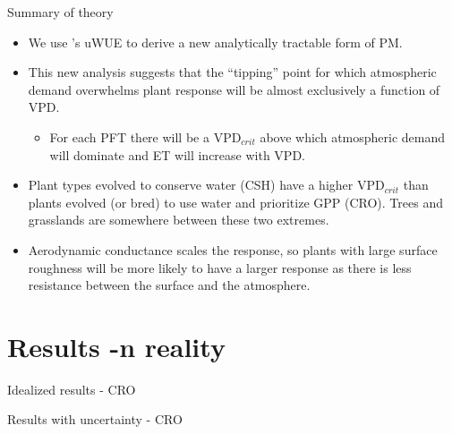 \documentclass{beamer}
\begin{document}
\begin{frame}{Summary of theory}
  \begin{itemize}
  \item We use \cite{Zhou_2016}'s uWUE to derive a new analytically tractable form of PM.
  \item This new analysis suggests that the ``tipping'' point for which atmospheric demand overwhelms plant response will be almost exclusively a function of VPD.
    \begin{itemize}
    \item For each PFT there will be a VPD$_{crit}$ above which atmospheric demand will dominate and ET will increase with VPD.
    \end{itemize}
  \item Plant types evolved to conserve water (CSH) have a higher VPD$_{crit}$ than plants evolved (or bred) to use water and prioritize GPP (CRO). Trees and grasslands are somewhere between these two extremes.
  \item Aerodynamic conductance scales the response, so plants with large surface roughness will be more likely to have a larger response as there is less resistance between the surface and the atmosphere.
  \end{itemize}
\end{frame}

\section{Results -n reality}
{ %
    \begin{frame}[plain]{Idealized results - CRO}
     \end{frame}
}

{ %
    \begin{frame}[plain]{Results with uncertainty - CRO}
     \end{frame}
}
\end{document}
